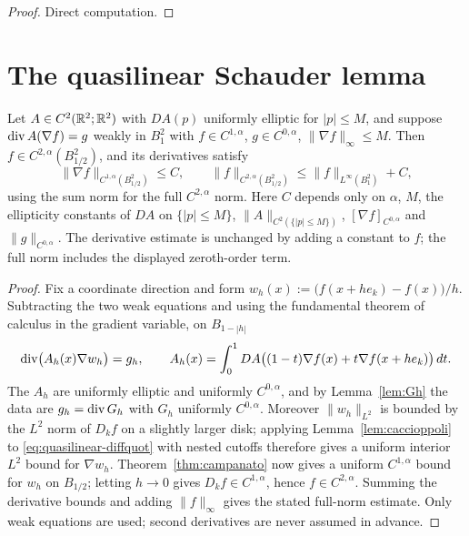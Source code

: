 \begin{proof}
Direct computation.
\end{proof}

\section{The quasilinear Schauder lemma}\label{sec:quasilinear}

\begin{theorem}\label{thm:quasilinear-schauder}
Let $A\in C^2(\mathbb R^2;\mathbb R^2)$ with $DA(p)$ uniformly elliptic for $|p|\le M$, and
suppose $\operatorname{div} A(\nabla f)=g$ weakly in $B_1^2$ with
$f\in C^{1,\alpha}$, $g\in C^{0,\alpha}$, $\|\nabla f\|_\infty\le M$.  Then
$f\in C^{2,\alpha}(B_{1/2}^2)$, and its derivatives satisfy
\[
 \|\nabla f\|_{C^{1,\alpha}(B_{1/2}^2)}\le C,
 \qquad
 \|f\|_{C^{2,\alpha}(B_{1/2}^2)}
 \le \|f\|_{L^\infty(B_1^2)}+C,
\]
using the sum norm for the full $C^{2,\alpha}$ norm.  Here $C$ depends only on
$\alpha$, $M$, the ellipticity constants of $DA$ on $\{|p|\le M\}$,
$\|A\|_{C^2(\{|p|\le M\})}$, $[\nabla f]_{C^{0,\alpha}}$ and
$\|g\|_{C^{0,\alpha}}$.  The derivative estimate is unchanged by adding a
constant to $f$; the full norm includes the displayed zeroth-order term.
\end{theorem}

\begin{proof}
Fix a coordinate direction and form
$w_h(x):=\bigl(f(x+he_k)-f(x)\bigr)/h$.  Subtracting the two weak equations
and using the fundamental theorem of calculus in the gradient variable, on
$B_{1-|h|}$
\begin{equation}\label{eq:quasilinear-diffquot}
  \operatorname{div}\bigl(A_h(x)\nabla w_h\bigr)=g_h,
  \qquad
  A_h(x)=\int_0^1DA\bigl((1-t)\nabla f(x)+t\nabla f(x+he_k)\bigr)\,dt .
\end{equation}
The $A_h$ are uniformly elliptic and uniformly $C^{0,\alpha}$, and by
Lemma~\ref{lem:Gh} the data are $g_h=\operatorname{div} G_h$ with $G_h$ uniformly
$C^{0,\alpha}$.  Moreover $\|w_h\|_{L^2}$ is bounded by the
$L^2$ norm of $D_kf$ on a slightly larger disk; applying
Lemma~\ref{lem:caccioppoli} to \eqref{eq:quasilinear-diffquot} with nested
cutoffs therefore gives a uniform interior $L^2$ bound for $\nabla w_h$.
Theorem~\ref{thm:campanato} now gives a uniform $C^{1,\alpha}$
bound for $w_h$ on $B_{1/2}$; letting $h\to0$ gives
$D_kf\in C^{1,\alpha}$, hence $f\in C^{2,\alpha}$.  Summing the derivative
bounds and adding $\|f\|_\infty$ gives the stated full-norm estimate.  Only weak equations are
used; second derivatives are never assumed in advance.
\end{proof}

